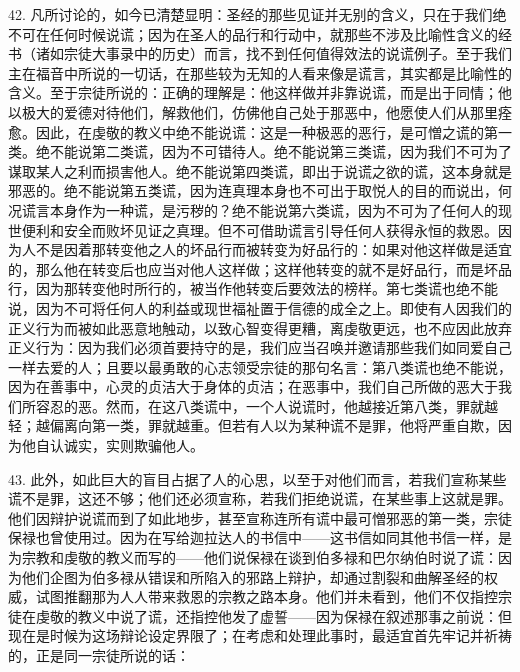 42. 凡所讨论的，如今已清楚显明：圣经的那些见证并无别的含义，只在于我们绝不可在任何时候说谎；因为在圣人的品行和行动中，就那些不涉及比喻性含义的经书（诸如宗徒大事录中的历史）而言，找不到任何值得效法的说谎例子。至于我们主在福音中所说的一切话，在那些较为无知的人看来像是谎言，其实都是比喻性的含义。至于宗徒所说的：正确的理解是：他这样做并非靠说谎，而是出于同情；他以极大的爱德对待他们，解救他们，仿佛他自己处于那恶中，他愿使人们从那里痊愈。因此，在虔敬的教义中绝不能说谎：这是一种极恶的恶行，是可憎之谎的第一类。绝不能说第二类谎，因为不可错待人。绝不能说第三类谎，因为我们不可为了谋取某人之利而损害他人。绝不能说第四类谎，即出于说谎之欲的谎，这本身就是邪恶的。绝不能说第五类谎，因为连真理本身也不可出于取悦人的目的而说出，何况谎言本身作为一种谎，是污秽的？绝不能说第六类谎，因为不可为了任何人的现世便利和安全而败坏见证之真理。但不可借助谎言引导任何人获得永恒的救恩。因为人不是因着那转变他之人的坏品行而被转变为好品行的：如果对他这样做是适宜的，那么他在转变后也应当对他人这样做；这样他转变的就不是好品行，而是坏品行，因为那转变他时所行的，被当作他转变后要效法的榜样。第七类谎也绝不能说，因为不可将任何人的利益或现世福祉置于信德的成全之上。即使有人因我们的正义行为而被如此恶意地触动，以致心智变得更糟，离虔敬更远，也不应因此放弃正义行为：因为我们必须首要持守的是，我们应当召唤并邀请那些我们如同爱自己一样去爱的人；且要以最勇敢的心志领受宗徒的那句名言：第八类谎也绝不能说，因为在善事中，心灵的贞洁大于身体的贞洁；在恶事中，我们自己所做的恶大于我们所容忍的恶。然而，在这八类谎中，一个人说谎时，他越接近第八类，罪就越轻；越偏离向第一类，罪就越重。但若有人以为某种谎不是罪，他将严重自欺，因为他自认诚实，实则欺骗他人。\par

43. 此外，如此巨大的盲目占据了人的心思，以至于对他们而言，若我们宣称某些谎不是罪，这还不够；他们还必须宣称，若我们拒绝说谎，在某些事上这就是罪。他们因辩护说谎而到了如此地步，甚至宣称连所有谎中最可憎邪恶的第一类，宗徒保禄也曾使用过。因为在写给迦拉达人的书信中——这书信如同其他书信一样，是为宗教和虔敬的教义而写的——他们说保禄在谈到伯多禄和巴尔纳伯时说了谎：因为他们企图为伯多禄从错误和所陷入的邪路上辩护，却通过割裂和曲解圣经的权威，试图推翻那为人人带来救恩的宗教之路本身。他们并未看到，他们不仅指控宗徒在虔敬的教义中说了谎，还指控他发了虚誓——因为保禄在叙述那事之前说：但现在是时候为这场辩论设定界限了；在考虑和处理此事时，最适宜首先牢记并祈祷的，正是同一宗徒所说的话：\par

